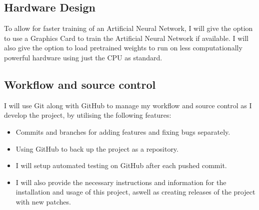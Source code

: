 \documentclass[./project-report/src/latex/project-report.tex]{subfiles}
\begin{document}
\subsection{Hardware Design}

To allow for faster training of an Artificial Neural Network, I will give the option to use a Graphics Card to train the Artificial Neural Network if available. 
I will also give the option to load pretrained weights to run on less computationally powerful hardware using just the CPU as standard.

\subsection{Workflow and source control}

I will use Git along with GitHub to manage my workflow and source control as I develop the project, by utilising the following features:

\begin{itemize}
    \item Commits and branches for adding features and fixing bugs separately.
    \item Using GitHub to back up the project as a repository.
    \item I will setup automated testing on GitHub after each pushed commit.
    \item I will also provide the necessary instructions and information for the installation and usage of this project, aswell as creating releases of the project 
          with new patches.
\end{itemize}
\end{document}

